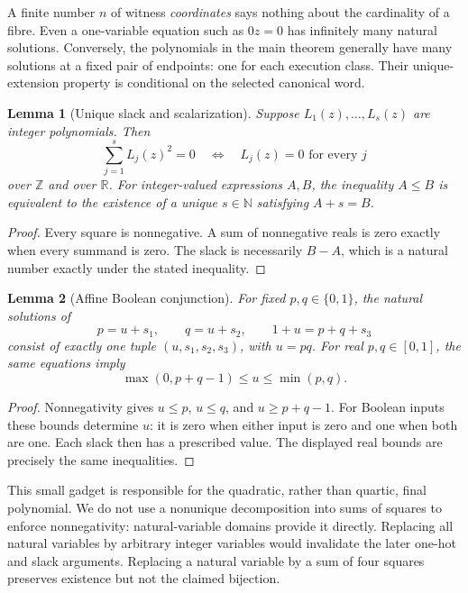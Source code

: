 \documentclass[11pt,a4paper]{article}
\newtheorem{lemma}[lemma]{Lemma}
\theoremstyle{definition}
\theoremstyle{remark}
\newcommand{\N}{\mathbb N}
\newcommand{\Z}{\mathbb Z}
\newcommand{\R}{\mathbb R}
\begin{document}
A finite number $n$ of witness \emph{coordinates} says nothing about the cardinality of a fibre. Even a one-variable equation such as $0z=0$ has infinitely many natural solutions. Conversely, the polynomials in the main theorem generally have many solutions at a fixed pair of endpoints: one for each execution class. Their unique-extension property is conditional on the selected canonical word.

\begin{lemma}[Unique slack and scalarization]\label{cdc:lem:slack}
Suppose $L_1(z),\ldots,L_s(z)$ are integer polynomials. Then
\[
\sum_{j=1}^s L_j(z)^2=0\quad\Longleftrightarrow\quad
L_j(z)=0\text{ for every }j
\]
over $\Z$ and over $\R$. For integer-valued expressions $A,B$, the inequality $A\le B$ is equivalent to the existence of a \emph{unique} $s\in\N$ satisfying $A+s=B$.
\end{lemma}
\begin{proof}
Every square is nonnegative. A sum of nonnegative reals is zero exactly when every summand is zero. The slack is necessarily $B-A$, which is a natural number exactly under the stated inequality.
\end{proof}

\begin{lemma}[Affine Boolean conjunction]\label{cdc:lem:and}
For fixed $p,q\in\{0,1\}$, the natural solutions of
\begin{equation}\label{cdc:eq:and}
p=u+s_1,\qquad q=u+s_2,\qquad
1+u=p+q+s_3
\end{equation}
consist of exactly one tuple $(u,s_1,s_2,s_3)$, with $u=pq$.
For real $p,q\in[0,1]$, the same equations imply
\[
\max(0,p+q-1)\le u\le\min(p,q).
\]
\end{lemma}
\begin{proof}
Nonnegativity gives $u\le p$, $u\le q$, and $u\ge p+q-1$. For Boolean inputs these bounds determine $u$: it is zero when either input is zero and one when both are one. Each slack then has a prescribed value. The displayed real bounds are precisely the same inequalities.
\end{proof}

This small gadget is responsible for the quadratic, rather than quartic, final polynomial. We do not use a nonunique decomposition into sums of squares to enforce nonnegativity: natural-variable domains provide it directly. Replacing all natural variables by arbitrary integer variables would invalidate the later one-hot and slack arguments. Replacing a natural variable by a sum of four squares preserves existence but not the claimed bijection.
\end{document}
